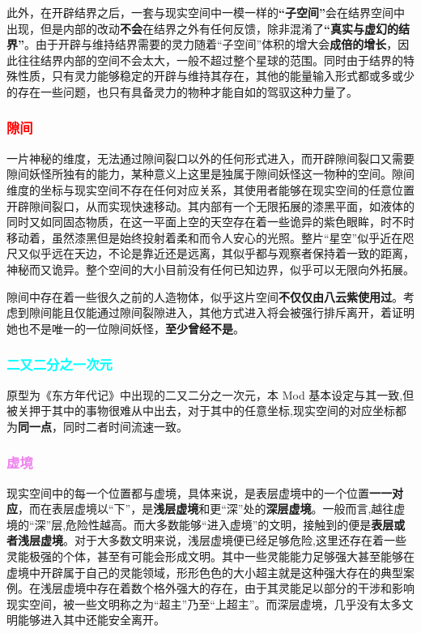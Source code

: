 \documentclass[10.5pt,compsoc,UTF8]{CjC}
\theoremstyle{mystyle}
\begin{document}
{此外，在开辟结界之后，一套与现实空间中一模一样的\textbf{“子空间”}会在结界空间中出现，但是内部的改动\textbf{不会}在结界之外有任何反馈，除非混淆了\textbf{“真实与虚幻的结界”}。由于开辟与维持结界需要的灵力随着“子空间”体积的增大会\textbf{成倍的增长}，因此往往结界内部的空间不会太大，一般不超过整个星球的范围。同时由于结界的特殊性质，只有灵力能够稳定的开辟与维持其存在，其他的能量输入形式都或多或少的存在一些问题，也只有具备灵力的物种才能自如的驾驭这种力量了。

\subsubsection{\textcolor{red}{隙间}}

一片神秘的维度，无法通过隙间裂口以外的任何形式进入，而开辟隙间裂口又需要隙间妖怪所独有的能力，某种意义上这里是独属于隙间妖怪这一物种的空间。隙间维度的坐标与现实空间不存在任何对应关系，其使用者能够在现实空间的任意位置开辟隙间裂口，从而实现快速移动。其内部有一个无限拓展的漆黑平面，如液体的同时又如同固态物质，在这一平面上空的天空存在着一些诡异的紫色眼眸，时不时移动着，虽然漆黑但是始终投射着柔和而令人安心的光照。整片“星空”似乎近在咫尺又似乎远在天边，不论是靠近还是远离，其似乎都与观察者保持着一致的距离，神秘而又诡异。整个空间的大小目前没有任何已知边界，似乎可以无限向外拓展。

隙间中存在着一些很久之前的人造物体，似乎这片空间\textbf{不仅仅由八云紫使用过}。考虑到隙间能且仅能通过隙间裂隙进入，其他方式进入将会被强行排斥离开，着证明她也不是唯一的一位隙间妖怪，\textbf{至少曾经不是}。

\subsubsection{\textcolor{cyan}{二又二分之一次元}}

原型为《东方年代记》中出现的二又二分之一次元，本 Mod 基本设定与其一致,但被关押于其中的事物很难从中出去，对于其中的任意坐标,现实空间的对应坐标都为\textbf{同一点}，同时二者时间流速一致。

\subsubsection{\textcolor{violet}{虚境}}

现实空间中的每一个位置都与虚境，具体来说，是表层虚境中的一个位置\textbf{一一对应}，而在表层虚境以“下”，是\textbf{浅层虚境}和更“深”处的\textbf{深层虚境}。一般而言,越往虚境的“深”层,危险性越高。而大多数能够“进入虚境”的文明，接触到的便是\textbf{表层或者浅层虚境}。对于大多数文明来说，浅层虚境便已经足够危险,这里还存在着一些灵能极强的个体，甚至有可能会形成文明。其中一些灵能能力足够强大甚至能够在虚境中开辟属于自己的灵能领域，形形色色的大小超主就是这种强大存在的典型案例。在浅层虚境中存在着数个格外强大的存在，由于其灵能足以部分的干涉和影响现实空间，被一些文明称之为“超主”乃至“上超主”。而深层虚境，几乎没有太多文明能够进入其中还能安全离开。

}
\end{document}
